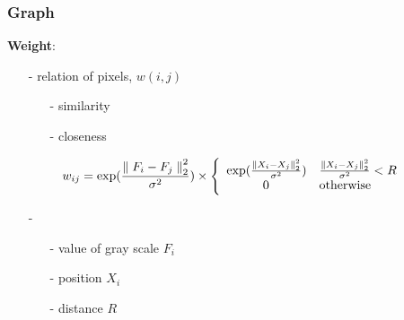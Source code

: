 \documentclass[notheorems,mathserif,table,compress]{beamer}  %
\begin{document}
\begin{frame}
\frametitle{Graph}

\textbf{\Large Weight}:
\begin{itemize}
\item[-] relation of pixels, $w(i,j)$
	\begin{itemize}
	\item[-] similarity
	\item[-] closeness\newline
	\end{itemize}
\end{itemize}
\begin{displaymath}
w_{ij}= \exp(\frac{{\parallel F_{i}-F_{j}\parallel}_{2}^2}{{\sigma}^2}) \times \left \{ \begin{array}{ll}
   \exp(\frac{{\parallel X_{i}-X_{j}\parallel}_{2}^2}{{\sigma}^2}) & \frac{{\parallel X_{i}-X_{j}\parallel}_{2}^2}{{\sigma}^2} < R\\
   \hspace{0.4in} 0 & \textrm{otherwise} 
    \end{array} \right.
\end{displaymath}
       \begin{itemize}
	\item[-]
	\begin{itemize}
	\item[-] value of gray scale $F_{i}$
	\item[-] position $X_{i}$ 
	\item[-] distance $R$
	\end{itemize}
      \end{itemize}
\end{frame}
\end{document}
